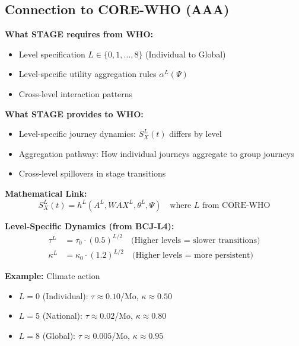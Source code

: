 \subsection{Connection to CORE-WHO (AAA)}

\begin{tcolorbox}[colback=blue!5!white, colframe=blue!75!black,
    title=Integration: STAGE $\leftrightarrow$ WHO]

\textbf{What STAGE requires from WHO:}
\begin{itemize}[nosep]
\item Level specification $L \in \{0, 1, \ldots, 8\}$ (Individual to Global)
\item Level-specific utility aggregation rules $\alpha^L(\Psi)$
\item Cross-level interaction patterns
\end{itemize}

\textbf{What STAGE provides to WHO:}
\begin{itemize}[nosep]
\item Level-specific journey dynamics: $S^L_X(t)$ differs by level
\item Aggregation pathway: How individual journeys aggregate to group journeys
\item Cross-level spillovers in stage transitions
\end{itemize}

\textbf{Mathematical Link:}
\begin{equation}
S^L_X(t) = h^L(A^L, WAX^L, \theta^L, \Psi) \quad \text{where } L \text{ from CORE-WHO}
\end{equation}

\textbf{Level-Specific Dynamics (from BCJ-L4):}
\begin{align}
\tau^L &= \tau_0 \cdot (0.5)^{L/2} \quad \text{(Higher levels = slower transitions)} \\
\kappa^L &= \kappa_0 \cdot (1.2)^{L/2} \quad \text{(Higher levels = more persistent)}
\end{align}

\textbf{Example:} Climate action
\begin{itemize}[nosep]
\item $L=0$ (Individual): $\tau \approx 0.10$/Mo, $\kappa \approx 0.50$
\item $L=5$ (National): $\tau \approx 0.02$/Mo, $\kappa \approx 0.80$
\item $L=8$ (Global): $\tau \approx 0.005$/Mo, $\kappa \approx 0.95$
\end{itemize}
\end{tcolorbox}

